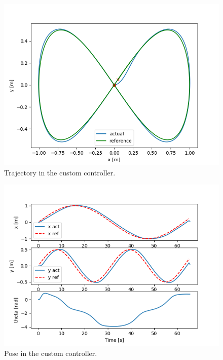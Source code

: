 \documentclass[11pt,a4paper]{article}
\begin{document}
\begin{figure}[H]
    \centering
    \includegraphics[scale=0.4]{kin_screenshots/Trajectory.png}
    \caption{Trajectory in the custom controller.}
\end{figure}

\begin{figure}[H]
    \centering
    \includegraphics[scale=0.4]{kin_screenshots/Pose.png}
    \caption{Pose in the custom controller.}
\end{figure}
\end{document}
